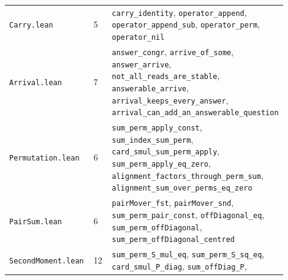\documentclass[10pt,letterpaper,twocolumn]{article}
\begin{document}
\begin{center}
{\footnotesize
{}
\tabletail{\midrule}
\tablelasttail{\bottomrule}
\begin{xtabular}{L{0.372\linewidth}L{0.138\linewidth}L{0.386\linewidth}}
\texttt{Carry.\allowbreak{}lean} & 5 & \texttt{carry\_\allowbreak{}identity},
\texttt{operator\_\allowbreak{}append},
\texttt{operator\_\allowbreak{}append\_\allowbreak{}sub},
\texttt{operator\_\allowbreak{}perm},
\texttt{operator\_\allowbreak{}nil} \\
\texttt{Arrival.\allowbreak{}lean} & 7 & \texttt{answer\_\allowbreak{}congr},
\texttt{arrive\_\allowbreak{}of\_\allowbreak{}some},
\texttt{answer\_\allowbreak{}arrive},
\texttt{not\_\allowbreak{}all\_\allowbreak{}reads\_\allowbreak{}are\_\allowbreak{}stable},
\texttt{answerable\_\allowbreak{}arrive},
\texttt{arrival\_\allowbreak{}keeps\_\allowbreak{}every\_\allowbreak{}answer},
\texttt{arrival\_\allowbreak{}can\_\allowbreak{}add\_\allowbreak{}an\_\allowbreak{}answerable\_\allowbreak{}question} \\
\texttt{Permutation.\allowbreak{}lean} & 6 & \texttt{sum\_\allowbreak{}perm\_\allowbreak{}apply\_\allowbreak{}const},
\texttt{sum\_\allowbreak{}index\_\allowbreak{}sum\_\allowbreak{}perm},
\texttt{card\_\allowbreak{}smul\_\allowbreak{}sum\_\allowbreak{}perm\_\allowbreak{}apply},
\texttt{sum\_\allowbreak{}perm\_\allowbreak{}apply\_\allowbreak{}eq\_\allowbreak{}zero},
\texttt{alignment\_\allowbreak{}factors\_\allowbreak{}through\_\allowbreak{}perm\_\allowbreak{}sum},
\texttt{alignment\_\allowbreak{}sum\_\allowbreak{}over\_\allowbreak{}perms\_\allowbreak{}eq\_\allowbreak{}zero} \\
\texttt{PairSum.\allowbreak{}lean} & 6 & \texttt{pairMover\_\allowbreak{}fst},
\texttt{pairMover\_\allowbreak{}snd},
\texttt{sum\_\allowbreak{}perm\_\allowbreak{}pair\_\allowbreak{}const},
\texttt{offDiagonal\_\allowbreak{}eq},
\texttt{sum\_\allowbreak{}perm\_\allowbreak{}offDiagonal},
\texttt{sum\_\allowbreak{}perm\_\allowbreak{}offDiagonal\_\allowbreak{}centred} \\
\texttt{SecondMoment.\allowbreak{}lean} & 12 & \texttt{sum\_\allowbreak{}perm\_\allowbreak{}S\_\allowbreak{}mul\_\allowbreak{}eq},
\texttt{sum\_\allowbreak{}perm\_\allowbreak{}S\_\allowbreak{}sq\_\allowbreak{}eq},
\texttt{card\_\allowbreak{}smul\_\allowbreak{}P\_\allowbreak{}diag},
\texttt{sum\_\allowbreak{}offDiag\_\allowbreak{}P},

\end{xtabular}}
\end{center}
\end{document}
